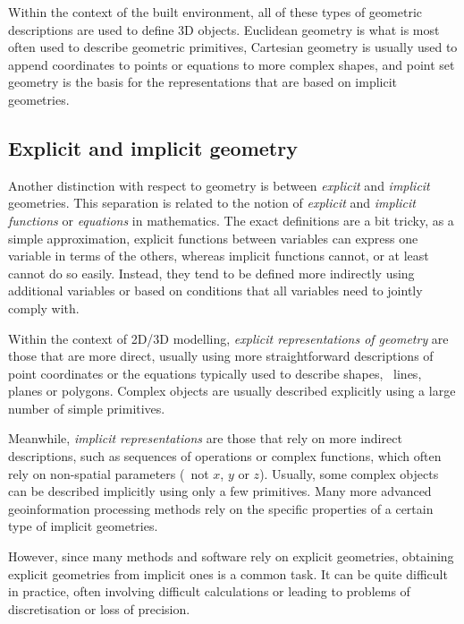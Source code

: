 Within the context of the built environment, all of these types of geometric descriptions are used to define 3D objects.
Euclidean geometry is what is most often used to describe geometric primitives, Cartesian geometry is usually used to append coordinates to points or equations to more complex shapes, and point set geometry is the basis for the representations that are based on implicit geometries.

\subsection{Explicit and implicit geometry}

Another distinction with respect to geometry is between \emph{explicit} and \emph{implicit} geometries.
This separation is related to the notion of \emph{explicit} and \emph{implicit functions} or \emph{equations} in mathematics.
The exact definitions are a bit tricky, as a simple approximation, explicit functions between variables can express one variable in terms of the others, whereas implicit functions cannot, or at least cannot do so easily.
Instead, they tend to be defined more indirectly using additional variables or based on conditions that all variables need to jointly comply with.

Within the context of 2D/3D modelling, \emph{explicit representations of geometry} are those that are more direct, usually using more straightforward descriptions of point coordinates or the equations typically used to describe shapes, \eg\ lines, planes or polygons.
Complex objects are usually described explicitly using a large number of simple primitives.

Meanwhile, \emph{implicit representations} are those that rely on more indirect descriptions, such as sequences of operations or complex functions, which often rely on non-spatial parameters (\ie\ not \(x\), \(y\) or \(z\)).
Usually, some complex objects can be described implicitly using only a few primitives.
Many more advanced geoinformation processing methods rely on the specific properties of a certain type of implicit geometries.

However, since many methods and software rely on explicit geometries, obtaining explicit geometries from implicit ones is a common task.
It can be quite difficult in practice, often involving difficult calculations or leading to problems of discretisation or loss of precision.

